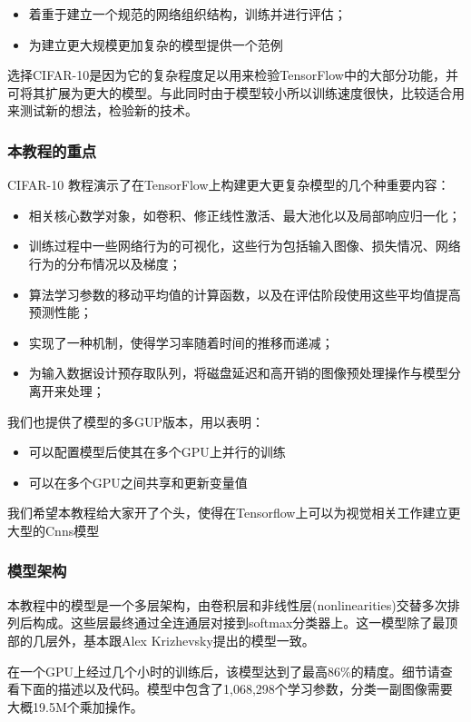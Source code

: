\begin{itemize}
\item 着重于建立一个规范的网络组织结构，训练并进行评估；
\item 为建立更大规模更加复杂的模型提供一个范例
\end{itemize}

选择CIFAR-10是因为它的复杂程度足以用来检验TensorFlow中的大部分功能，并可将其扩展为更大的模型。与此同时由于模型较小所以训练速度很快，比较适合用来测试新的想法，检验新的技术。

\subsubsection {本教程的重点}
CIFAR-10 教程演示了在TensorFlow上构建更大更复杂模型的几个种重要内容：

\begin{itemize}
\item 相关核心数学对象，如卷积、修正线性激活、最大池化以及局部响应归一化；
\item 训练过程中一些网络行为的可视化，这些行为包括输入图像、损失情况、网络行为的分布情况以及梯度；
\item 算法学习参数的移动平均值的计算函数，以及在评估阶段使用这些平均值提高预测性能；
\item 实现了一种机制，使得学习率随着时间的推移而递减；
\item 为输入数据设计预存取队列，将磁盘延迟和高开销的图像预处理操作与模型分离开来处理；
\end{itemize}

我们也提供了模型的多GUP版本，用以表明：

\begin{itemize}
\item 可以配置模型后使其在多个GPU上并行的训练
\item 可以在多个GPU之间共享和更新变量值
\end{itemize}

我们希望本教程给大家开了个头，使得在Tensorflow上可以为视觉相关工作建立更大型的Cnns模型

\subsubsection {模型架构}

本教程中的模型是一个多层架构，由卷积层和非线性层(nonlinearities)交替多次排列后构成。这些层最终通过全连通层对接到softmax分类器上。这一模型除了最顶部的几层外，基本跟Alex Krizhevsky提出的模型一致。

在一个GPU上经过几个小时的训练后，该模型达到了最高86\%的精度。细节请查看下面的描述以及代码。模型中包含了1,068,298个学习参数，分类一副图像需要大概19.5M个乘加操作。

